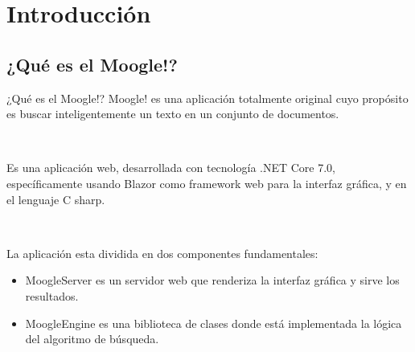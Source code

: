 \section{Introducción}

\subsection{¿Qué es el Moogle!?}
\begin{frame}{¿Qué es el Moogle!?}
    Moogle! es una aplicación totalmente original cuyo propósito es
buscar inteligentemente un texto en un conjunto de documentos.

\

Es una aplicación web, desarrollada con tecnología .NET Core
7.0, específicamente usando Blazor como framework web para la
interfaz gráfica, y en el lenguaje C sharp.

\

La aplicación esta dividida en dos componentes fundamentales:
\pause
\begin{itemize}
    \item MoogleServer es un servidor web que renderiza la interfaz
    gráfica y sirve los resultados.

\pause 
    
    \item MoogleEngine es una biblioteca de clases donde está
    implementada la lógica del algoritmo de búsqueda.
\end{itemize}    
\end{frame} 
